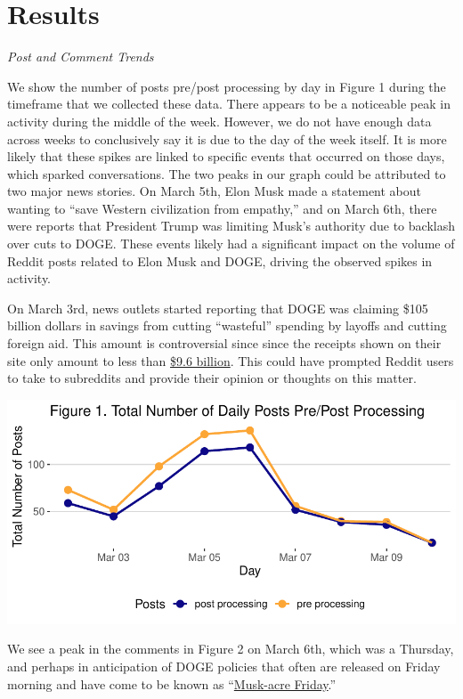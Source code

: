 \documentclass[
  12pt]{article}
\begin{document}
\section{Results}\label{results}

\emph{Post and Comment Trends}

We show the number of posts pre/post processing by day in Figure 1
during the timeframe that we collected these data. There appears to be a
noticeable peak in activity during the middle of the week. However, we
do not have enough data across weeks to conclusively say it is due to
the day of the week itself. It is more likely that these spikes are
linked to specific events that occurred on those days, which sparked
conversations. The two peaks in our graph could be attributed to two
major news stories. On March 5th, Elon Musk made a statement about
wanting to ``save Western civilization from empathy,'' and on March 6th,
there were reports that President Trump was limiting Musk's authority
due to backlash over cuts to DOGE. These events likely had a significant
impact on the volume of Reddit posts related to Elon Musk and DOGE,
driving the observed spikes in activity.

On March 3rd, news outlets started reporting that DOGE was claiming
\$105 billion dollars in savings from cutting ``wasteful'' spending by
layoffs and cutting foreign aid. This amount is controversial since
since the receipts shown on their site only amount to less than
\href{https://abcnews.go.com/US/doge-website-now-saved-105-billion-backtracked-earlier/story?id=119408347}{\$9.6
billion}. This could have prompted Reddit users to take to subreddits
and provide their opinion or thoughts on this matter.

\includegraphics{paper_files/figure-pdf/unnamed-chunk-3-1.pdf}

We see a peak in the comments in Figure 2 on March 6th, which was a
Thursday, and perhaps in anticipation of DOGE policies that often are
released on Friday morning and have come to be known as
``\href{https://smotus.substack.com/p/friday-night-musk-acre}{Musk-acre
Friday}.''
\end{document}
